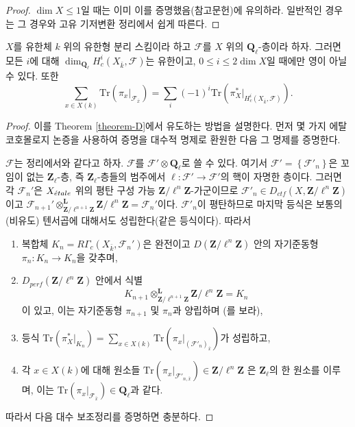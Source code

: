 \begin{proof}
$\dim X \leq 1$일 때는 이미 이를 증명했음(참고문헌)에 유의하라.
일반적인 경우는 그 경우와 고유 기저변환 정리에서 쉽게 따른다.
\end{proof}

\begin{theorem}
\label{theorem-C}
$X$를 유한체 $k$ 위의 유한형 분리 스킴이라 하고
$\mathcal{F}$를 $X$ 위의 $\mathbf{Q}_\ell$-층이라 하자. 그러면 모든
$i$에 대해 $\dim_{\mathbf{Q}_\ell}H_c^i(X_{\bar k}, \mathcal{F})$는
유한이고, $0\leq i \leq 2 \dim X$일 때에만 영이 아닐 수 있다.
또한
$$
\sum_{x\in X(k)} \text{Tr}\left(\pi_x |_{\mathcal{F}_{\bar x}}\right) =
\sum_i (-1)^i\text{Tr}\left(\pi_X^* |_{H_c^i(X_{\bar k}, \mathcal{F})}\right).
$$
\end{theorem}

\begin{proof}
이를 Theorem \ref{theorem-D}에서 유도하는 방법을 설명한다.
먼저 몇 가지 에탈 코호몰로지 논증을 사용하여 증명을 대수적 명제로
환원한 다음 그 명제를 증명한다.

\medskip\noindent
$\mathcal{F}$는 정리에서와 같다고 하자. $\mathcal{F}$를
$\mathcal{F}'\otimes \mathbf{Q}_\ell$로 쓸 수 있다. 여기서
$\mathcal{F}' = \left\{\mathcal{F}'_n\right\}$은 꼬임이 없는
$\mathbf{Z}_\ell$-층, 즉 $\mathbf{Z}_\ell$-층들의 범주에서
$\ell : \mathcal{F}'\to \mathcal{F}'$의 핵이 자명한 층이다.
그러면 각 $\mathcal{F}_n'$은 $X_{\acute{e}tale}$ 위의 평탄 구성 가능
$\mathbf{Z}/\ell^n\mathbf{Z}$-가군이므로
$\mathcal{F}'_n \in D_{ctf}(X, \mathbf{Z}/\ell^n\mathbf{Z})$이고
$\mathcal{F}_{n+1}'
\otimes^{\mathbf{L}}_{\mathbf{Z}/\ell^{n+1}\mathbf{Z}}
\mathbf{Z}/\ell^n\mathbf{Z} = \mathcal{F}_n'$이다.
$\mathcal{F}'_n$이 평탄하므로 마지막 등식은 보통의
(비유도) 텐서곱에 대해서도 성립한다(같은 등식이다). 따라서
\begin{enumerate}
\item
복합체 $K_n = R\Gamma_c\left(X_{\bar k}, \mathcal{F}_n'\right)$은
완전이고 $D(\mathbf{Z}/\ell^n\mathbf{Z})$ 안의 자기준동형
$\pi_n : K_n\to K_n$을 갖추며,
\item
$D_{perf}(\mathbf{Z}/\ell^n\mathbf{Z})$ 안에서 식별
$$
K_{n+1}
\otimes^{\mathbf{L}}_{\mathbf{Z}/\ell^{n+1}\mathbf{Z}}
\mathbf{Z}/\ell^n\mathbf{Z}
=
K_n
$$
이 있고, 이는 자기준동형 $\pi_{n+1}$ 및 $\pi_n$과 양립하며
(\cite[Rapport 4.12]{SGA4.5}를 보라),
\item
등식 $\text{Tr}\left(\pi_X^* |_{K_n}\right) =
\sum_{x\in X(k)} \text{Tr}\left(\pi_x |_{(\mathcal{F}'_n)_{\bar x}}\right)$가
성립하고,
\item
각 $x\in X(k)$에 대해 원소들
$\text{Tr}(\pi_x |_{\mathcal{F}'_{n, \bar x}}) \in \mathbf{Z}/\ell^n\mathbf{Z}$
은 $\mathbf{Z}_\ell$의 한 원소를 이루며, 이는
$\text{Tr}(\pi_x |_{\mathcal{F}_{\bar x}}) \in \mathbf{Q}_\ell$과 같다.
\end{enumerate}
따라서 다음 대수 보조정리를 증명하면 충분하다.
\end{proof}

